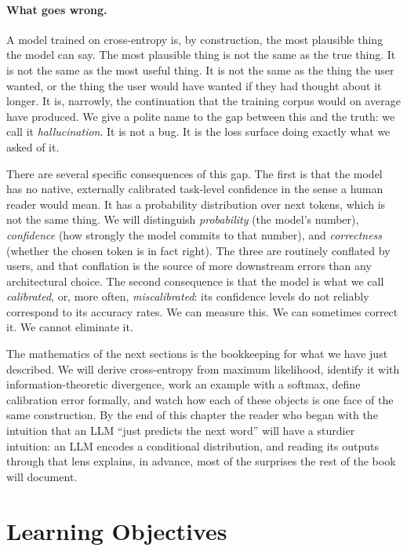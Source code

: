\paragraph{What goes wrong.} A model trained on cross-entropy is,
by construction, the most plausible thing the model can say. The
most plausible thing is not the same as the true thing. It is not
the same as the most useful thing. It is not the same as the
thing the user wanted, or the thing the user would have wanted if
they had thought about it longer. It is, narrowly, the
continuation that the training corpus would on average have
produced. We give a polite name to the gap between this and the
truth: we call it \emph{hallucination}. It is not a bug. It is the
loss surface doing exactly what we asked of it.

There are several specific consequences of this gap. The first is
that the model has no native, externally calibrated task-level
confidence in the sense a human reader would mean. It has a
probability distribution over
next tokens, which is not the same thing. We will distinguish
\emph{probability} (the model's number), \emph{confidence} (how
strongly the model commits to that number), and
\emph{correctness} (whether the chosen token is in fact right).
The three are routinely conflated by users, and that conflation is
the source of more downstream errors than any architectural
choice. The second consequence is that the model is what we call
\emph{calibrated}, or, more often, \emph{miscalibrated}: its
confidence levels do not reliably correspond to its accuracy
rates. We can measure this. We can sometimes correct it. We
cannot eliminate it.

The mathematics of the next sections is the bookkeeping for what
we have just described. We will derive cross-entropy from
maximum likelihood, identify it with information-theoretic
divergence, work an example with a softmax, define
calibration error formally, and watch how each of these objects
is one face of the same construction. By the end of this chapter
the reader who began with the intuition that an LLM ``just
predicts the next word'' will have a sturdier intuition: an LLM
encodes a conditional distribution, and reading its outputs
through that lens explains, in advance, most of the surprises the
rest of the book will document.

\section{Learning Objectives}


